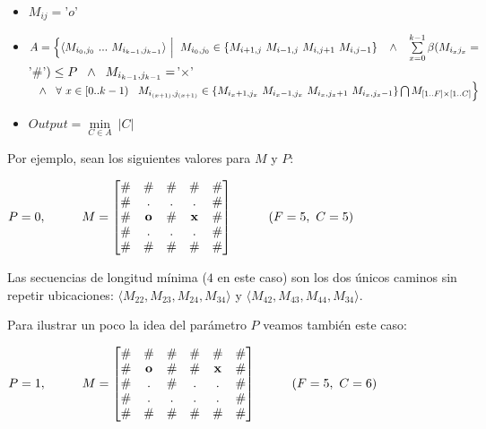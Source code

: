     \begin{itemize}
        \item $ M_{ij} = $'$ o $'$ $
        \item $A = \Big\{ \langle {M_{i_0, j_0}\ ...\ M_{i_{k-1}, j_{k-1}}} \rangle \ \Big | \kern 0.2cm
        M_{i_0,j_0} \in \{M_{i+1,j}\ M_{i-1,j}\ M_{i,j+1}\ M_{i,j-1}\} \kern 0.3cm \wedge \kern 0.3cm \sum\limits_{x=0}^{k-1} \beta(M_{i_x j_x} = $'$\#$'$) \leq P \kern 0.2cm \wedge \kern 0.2cm
        M_{i_{k-1}, j_{k-1}} = $'$\times$'$ \kern 0.3cm \wedge \kern 0.3cm
        \forall\ x \in [0..k-1) \kern 0.3cm M_{i_{(x+1)},j_{(x+1)}} \in \{M_{i_x+1,j_x}\ M_{i_x-1,j_x}\ M_{i_x,j_x+1}\ M_{i_x,j_x-1}\} \bigcap \\ M_{[1..F]\times[1..C]} \Big\}$
        \item $Output = \min\limits_{C \in A}\ |C|$
    \end{itemize}

Por ejemplo, sean los siguientes valores para $M$ y $P$:
\\
    \begin{center}
        $P=0, \kern 1cm
        M =
        \begin{bmatrix}
            \# & \# & \# & \# & \# \\
            \# & . & . & . & \# \\
            \# & \mathbf{o} & \# & \mathbf{x} & \# \\
            \# & . & . & . & \# \\
            \# & \# & \# & \# & \#
        \end{bmatrix}
        \kern 1cm
        (F = 5,\ C = 5)
        $

    \end{center}

Las secuencias de longitud mínima ($4$ en este caso) son los dos únicos caminos sin repetir ubicaciones: $\langle {M_{22}, M_{23}, M_{24}, M_{34}} \rangle$ y $\langle {M_{42}, M_{43}, M_{44}, M_{34}} \rangle$.

Para ilustrar un poco la idea del parámetro $P$ veamos también este caso:
\\
    \begin{center}
        $P=1, \kern 1cm
        M =
        \begin{bmatrix}
            \#  &   \#         &    \#    &   \#         &   \# & \#    \\
            \#  &   \mathbf{o}  &    \#     & \#          & \mathbf{x}    &   \#    \\
            \#  &   .         &    \#    &    .          &   .  & \#   \\
            \#  &   .          &    .     &   .          &   . & \#    \\
            \#  &   \#         &    \#    &   \#         &   \# & \#
        \end{bmatrix}
        \kern 1cm
        (F = 5,\ C = 6)
        $
    \end{center}

